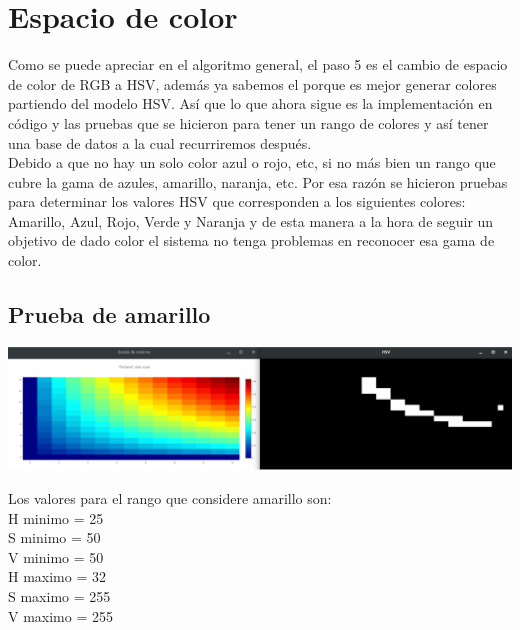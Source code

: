 
\section{Espacio de color}
Como se puede apreciar en el algoritmo general, el paso 5 es el cambio de espacio de color
de RGB a HSV, además ya sabemos el porque es mejor generar colores partiendo del
modelo HSV. Así que lo que ahora sigue es la implementación en código y las pruebas
que se hicieron para tener un rango de colores y así tener una base de datos a la
cual recurriremos después.\\
Debido a que no hay un solo color azul o rojo, etc, si no más bien un rango que cubre
la gama de azules, amarillo, naranja, etc. Por esa razón se hicieron pruebas para
determinar los valores HSV que corresponden a los siguientes colores: Amarillo, Azul,
Rojo, Verde y Naranja y de esta manera a la hora de seguir un objetivo de dado color
el sistema no tenga problemas en reconocer esa gama de color.
\subsection{Prueba de amarillo}
\begin{center}
    \includegraphics[width=1.0\textwidth]{Capitulo4/HSV_amarillo.eps}       
    \label{Fig6}
\end{center}
Los valores para el rango que considere amarillo son:\\
H minimo  = 25\\
S minimo = 50 \\
V minimo = 50 \\
H maximo = 32 \\
S maximo = 255 \\
V maximo = 255 

